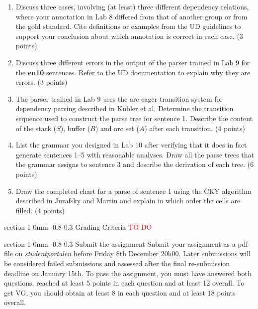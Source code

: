\documentclass[11pt]{article}
\makeatletter
\renewcommand{\section}{\@startsection
{section}%
{1}%
{0mm}%
{-0.8\baselineskip}%
{0.3\baselineskip}%
{\bfseries\large}}%
\makeatother
\begin{document}
\begin{enumerate}[itemsep=3pt]
\item Discuss three cases, involving (at least) three different dependency relations, where your annotation in Lab 8 differed from that of another group or from the gold standard. 
Cite definitions or examples from the UD guidelines to support your conclusion about which annotation is correct in each case. (3 points) 
\item Discuss three different errors in the output of the parser trained in Lab 9 for the \textbf{en10} sentences. Refer to the UD documentation to explain why they are errors. (3 points)
\item The parser trained in Lab 9 uses the arc-eager transition system for dependency parsing described in K\"{u}bler et al. Determine the transition sequence used to construct the parse tree for sentence 1. Describe the content of the stack ($S$), buffer ($B$) and arc set ($A$) after each transition. (4 points)
\item List the grammar you designed in Lab 10 after verifying that it does in fact generate sentences 1--5 with reasonable analyses. Draw all the parse trees that the grammar assigns to sentence 3 and describe the derivation of each tree. (6 points) 
\item Draw the completed chart for a parse of sentence 1 using the CKY algorithm described in Jurafsky and Martin and explain in which order the cells are filled. (4 points)
\end{enumerate}

\section{Grading Criteria}
\textcolor{red}{TO DO}

\section{Submit the assignment}
\noindent
Submit your assignment as a pdf file on \textit{studentportalen}
before Friday 8th December 20h00. Later submissions will be considered
failed submissions and assessed after the final re-submission deadline
on January 15th. To pass the assignment, you must have answered both
questions, reached at least 5 points in each question and at least 12
overall.  To get VG, you should obtain at least 8 in each question and
at least 18 points overall.    
\end{document}
